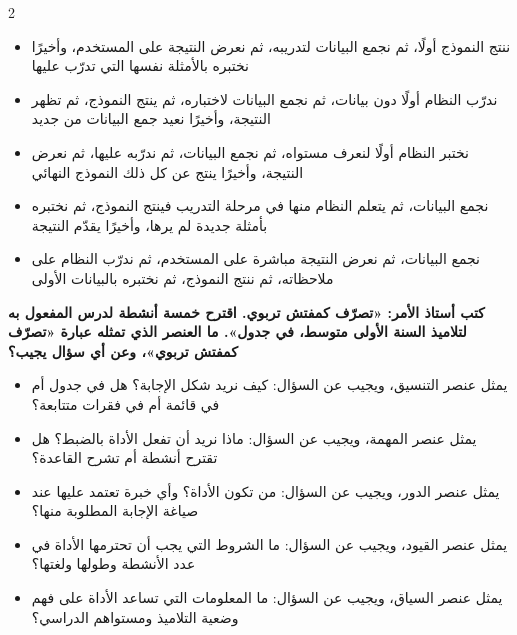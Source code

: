 \documentclass[10pt,a4paper]{article}
\begin{document}
\begin{multicols}{2}
\begin{minipage}{\linewidth}
\begin{itemize}[leftmargin=0.95cm, labelsep=4pt, itemsep=1pt, topsep=3pt, parsep=0pt]
  \item[\textbf{أ)}] ننتج النموذج أولًا، ثم نجمع البيانات لتدريبه، ثم نعرض النتيجة على المستخدم، وأخيرًا نختبره بالأمثلة نفسها التي تدرّب عليها
  \item[\textbf{ب)}] ندرّب النظام أولًا دون بيانات، ثم نجمع البيانات لاختباره، ثم ينتج النموذج، ثم تظهر النتيجة، وأخيرًا نعيد جمع البيانات من جديد
  \item[\textbf{ج)}] نختبر النظام أولًا لنعرف مستواه، ثم نجمع البيانات، ثم ندرّبه عليها، ثم نعرض النتيجة، وأخيرًا ينتج عن كل ذلك النموذج النهائي
  \item[\textbf{د)}] نجمع البيانات، ثم يتعلم النظام منها في مرحلة التدريب فينتج النموذج، ثم نختبره بأمثلة جديدة لم يرها، وأخيرًا يقدّم النتيجة
  \item[\textbf{هـ)}] نجمع البيانات، ثم نعرض النتيجة مباشرة على المستخدم، ثم ندرّب النظام على ملاحظاته، ثم ننتج النموذج، ثم نختبره بالبيانات الأولى
\end{itemize}
\end{minipage}\par\vspace{8pt plus 6pt}
\noindent\begin{minipage}{\linewidth}
\hangindent=0.7cm\textbf{كتب أستاذ الأمر: «تصرّف كمفتش تربوي. اقترح خمسة أنشطة لدرس المفعول به لتلاميذ السنة الأولى متوسط، في جدول». ما العنصر الذي تمثله عبارة «تصرّف كمفتش تربوي»، وعن أي سؤال يجيب؟}
\begin{itemize}[leftmargin=0.95cm, labelsep=4pt, itemsep=1pt, topsep=3pt, parsep=0pt]
  \item[\textbf{أ)}] يمثل عنصر التنسيق، ويجيب عن السؤال: كيف نريد شكل الإجابة؟ هل في جدول أم في قائمة أم في فقرات متتابعة؟
  \item[\textbf{ب)}] يمثل عنصر المهمة، ويجيب عن السؤال: ماذا نريد أن تفعل الأداة بالضبط؟ هل تقترح أنشطة أم تشرح القاعدة؟
  \item[\textbf{ج)}] يمثل عنصر الدور، ويجيب عن السؤال: من تكون الأداة؟ وأي خبرة تعتمد عليها عند صياغة الإجابة المطلوبة منها؟
  \item[\textbf{د)}] يمثل عنصر القيود، ويجيب عن السؤال: ما الشروط التي يجب أن تحترمها الأداة في عدد الأنشطة وطولها ولغتها؟
  \item[\textbf{هـ)}] يمثل عنصر السياق، ويجيب عن السؤال: ما المعلومات التي تساعد الأداة على فهم وضعية التلاميذ ومستواهم الدراسي؟
\end{itemize}
\end{minipage}\par\vspace{8pt plus 6pt}

\end{multicols}
\end{document}
